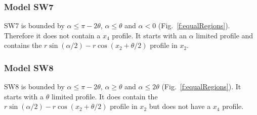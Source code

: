 


\subsubsection{Model SW7} \label{SW7}

SW7 is bounded by $\alpha \le \pi - 2\theta$, $\alpha \le \theta$ and $\alpha < 0$ (Fig.~\ref{f:equalRegions}). Therefore it does not contain a $x_4$ profile. It starts with an $\alpha$ limited profile and contains the $r\sin(\alpha/2) - r\cos(x_2 + \theta/2)$ profile in $x_2$.




\subsubsection{Model SW8} \label{SW8}

SW8 is bounded by $\alpha \le \pi - 2\theta$, $\alpha \ge \theta$ and $\alpha \le 2\theta$ (Fig.~\ref{f:equalRegions}). It starts with a $\theta$ limited profile. It does contain the $r\sin(\alpha/2) - r\cos(x_2 + \theta/2)$ profile in $x_2$ but does not have a $x_4$ profile.

